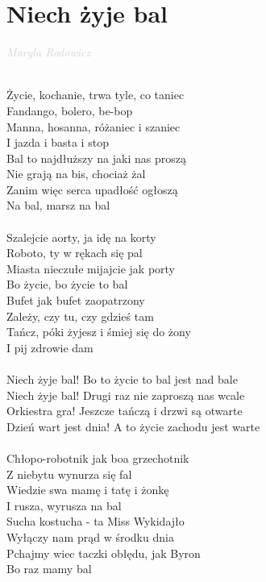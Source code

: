 \documentclass[a5paper, 10pt]{book}
\begin{document}
\section{Niech żyje bal}\textcolor{lightgray}{\textit{Maryla Rodowicz}}\\~\\
\begin{minipage}[t]{0.8\textwidth}
Życie, kochanie, trwa tyle, co taniec\\
Fandango, bolero, be-bop\\
Manna, hosanna, różaniec i szaniec\\
I jazda i basta i stop\\
Bal to najdłuższy na jaki nas proszą\\
Nie grają na bis, chociaż żal\\
Zanim więc serca upadłość ogłoszą\\
Na bal, marsz na bal\\
\\
Szalejcie aorty, ja idę na korty\\
Roboto, ty w rękach się pal\\
Miasta nieczułe mijajcie jak porty\\
Bo życie, bo życie to bal\\
Bufet jak bufet zaopatrzony\\
Zależy, czy tu, czy gdzieś tam\\
Tańcz, póki żyjesz i śmiej się do żony\\
I pij zdrowie dam\\
\\
\hspace*{5mm}Niech żyje bal! Bo to życie to bal jest nad bale\\
\hspace*{5mm}Niech żyje bal! Drugi raz nie zaproszą nas wcale\\
\hspace*{5mm}Orkiestra gra! Jeszcze tańczą i drzwi są otwarte\\
\hspace*{5mm}Dzień wart jest dnia! A to życie zachodu jest warte\\
\\
Chłopo-robotnik jak boa grzechotnik\\
Z niebytu wynurza się fal\\
Wiedzie swa mamę i tatę i żonkę\\
I rusza, wyrusza na bal\\
Sucha kostucha - ta Miss Wykidajło\\
Wyłączy nam prąd w środku dnia\\
Pchajmy wiec taczki obłędu, jak Byron\\
Bo raz mamy bal\\
\end{minipage}
\end{document}
